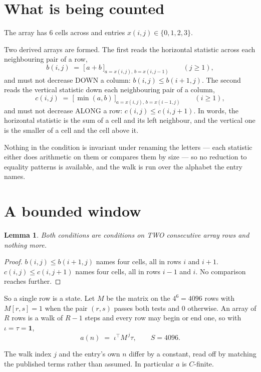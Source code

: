 \documentclass[11pt,a4paper]{article}
\theoremstyle{plain}
\newtheorem{lemma}[theorem]{Lemma}
\theoremstyle{definition}
\begin{document}
\section{What is being counted}

The array has $6$ cells across and entries $x(i,j)\in\{0,1,2,3\}$.

Two derived arrays are formed. The first reads the horizontal statistic across each
neighbouring pair of a row,
\[
b(i,j)\;=\;\bigl[\,a+b\,\bigr]_{a=x(i,j),\,b=x(i,j-1)}\qquad (j\ge1),
\]
and must not decrease DOWN a column: $b(i,j)\le b(i{+}1,j)$. The second reads the vertical
statistic down each neighbouring pair of a column,
\[
c(i,j)\;=\;\bigl[\,\min(a,b)\,\bigr]_{a=x(i,j),\,b=x(i{-}1,j)}\qquad (i\ge1),
\]
and must not decrease ALONG a row: $c(i,j)\le c(i,j{+}1)$. In words, the horizontal statistic
is the sum of a cell and its left neighbour, and the vertical one is
the smaller of a cell and the cell above it.

Nothing in the condition is invariant under renaming the letters --- each statistic either does
arithmetic on them or compares them by size --- so no reduction to equality patterns is
available, and the walk is run over the alphabet the entry names.

\section{A bounded window}

\begin{lemma}\label{lem:win}
Both conditions are conditions on TWO consecutive array rows and nothing more.
\end{lemma}

\begin{proof}
$b(i,j)\le b(i{+}1,j)$ names four cells, all in rows $i$ and $i+1$. $c(i,j)\le c(i,j{+}1)$
names four cells, all in rows $i-1$ and $i$. No comparison reaches further.
\end{proof}

So a single row is a state. Let $M$ be the matrix on the $4^{6}=4096$ rows with
$M[r,s]=1$ when the pair $(r,s)$ passes both tests and $0$ otherwise. An array of $R$ rows is a
walk of $R-1$ steps and every row may begin or end one, so with $\iota=\tau=\mathbf{1}$,
\[
a(n)\;=\;\iota^{\!\top}M^{\,j}\tau ,\qquad S=4096.
\]

The walk index $j$ and the entry's own $n$ differ by a constant, read off by matching the
published terms rather than assumed. In particular $a$ is $C$-finite.
\end{document}
